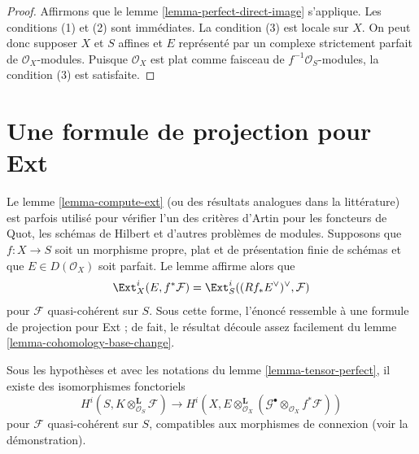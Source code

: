 \begin{proof}
Affirmons que le lemme \ref{lemma-perfect-direct-image} s'applique.
Les conditions (1) et (2) sont immédiates. La condition (3) est locale
sur $X$. On peut donc supposer $X$ et $S$ affines et $E$
représenté par un complexe strictement parfait de $\mathcal{O}_X$-modules.
Puisque $\mathcal{O}_X$ est plat comme faisceau de $f^{-1}\mathcal{O}_S$-modules,
la condition (3) est satisfaite.
\end{proof}






\section{Une formule de projection pour Ext}
\label{section-ext}

\noindent
Le lemme \ref{lemma-compute-ext} (ou des résultats analogues dans la littérature)
est parfois utilisé pour vérifier l'un des critères d'Artin pour les
foncteurs de Quot, les schémas de Hilbert et d'autres problèmes de modules.
Supposons que $f : X \to S$ soit un morphisme propre, plat et de présentation finie
de schémas et que $E \in D(\mathcal{O}_X)$ soit parfait.
Le lemme affirme alors que
$$
\Ext^i_X(E, f^*\mathcal{F}) =
\Ext^i_S((Rf_*E^\vee)^\vee, \mathcal{F})
$$
pour $\mathcal{F}$ quasi-cohérent sur $S$.
Sous cette forme, l'énoncé ressemble à une formule de projection
pour Ext ; de fait, le résultat découle assez
facilement du lemme \ref{lemma-cohomology-base-change}.

\begin{lemma}
\label{lemma-compute-tensor-perfect}
Sous les hypothèses et avec les notations du lemme \ref{lemma-tensor-perfect},
il existe des isomorphismes fonctoriels
$$
H^i(S, K \otimes^\mathbf{L}_{\mathcal{O}_S} \mathcal{F})
\longrightarrow
H^i(X, E \otimes_{\mathcal{O}_X}^\mathbf{L}
(\mathcal{G}^\bullet \otimes_{\mathcal{O}_X} f^*\mathcal{F}))
$$
pour $\mathcal{F}$ quasi-cohérent sur $S$,
compatibles aux morphismes de connexion (voir la démonstration).
\end{lemma}

